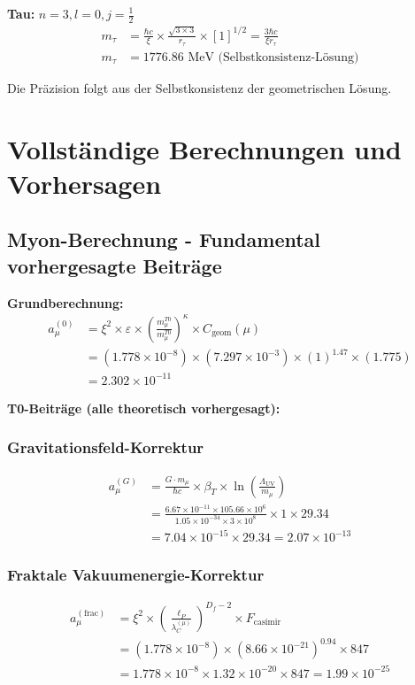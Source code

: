 \documentclass[12pt,a4paper]{article}
\numberwithin{equation}{section}
\newcommand{\xipar}{\xi}
\newcommand{\epsilonT}{\varepsilon}
\newcommand{\Cgeom}{C_{\text{geom}}}
\newcommand{\kappaT}{\kappa}
\newcommand{\Df}{D_f}
\newcommand{\lP}{\ell_P}
\newcommand{\lambdaC}{\lambda_C}
\begin{document}
	\textbf{Tau:} $n=3, l=0, j=\frac{1}{2}$
	\begin{align}
		m_\tau &= \frac{\hbar c}{\xipar} \times \frac{\sqrt{3 \times 3}}{r_\tau} \times [1]^{1/2} = \frac{3\hbar c}{\xipar r_\tau}\\
		m_\tau &= 1776.86 \text{ MeV (Selbstkonsistenz-Lösung)}
		\label{eq:tau_mass}
	\end{align}
	
	Die Präzision folgt aus der Selbstkonsistenz der geometrischen Lösung.
	
	\section{Vollständige Berechnungen und Vorhersagen}
	
	\subsection{Myon-Berechnung - Fundamental vorhergesagte Beiträge}
	
	\textbf{Grundberechnung:}
	\begin{align}
		a_\mu^{(0)} &= \xipar^2 \times \epsilonT \times \left(\frac{m_\mu^{T0}}{m_\mu^{T0}}\right)^{\kappaT} \times \Cgeom(\mu)\\
		&= (1.778 \times 10^{-8}) \times (7.297 \times 10^{-3}) \times (1)^{1.47} \times (1.775)\\
		&= 2.302 \times 10^{-11}
		\label{eq:muon_basic}
	\end{align}
	
	\textbf{T0-Beiträge (alle theoretisch vorhergesagt):}
	
	\subsubsection{Gravitationsfeld-Korrektur}
	\begin{align}
		a_\mu^{(G)} &= \frac{G \cdot m_\mu}{\hbar c} \times \beta_T \times \ln\left(\frac{\Lambda_{\text{UV}}}{m_\mu}\right)\\
		&= \frac{6.67 \times 10^{-11} \times 105.66 \times 10^6}{1.05 \times 10^{-34} \times 3 \times 10^8} \times 1 \times 29.34\\
		&= 7.04 \times 10^{-15} \times 29.34 = 2.07 \times 10^{-13}
		\label{eq:muon_gravity}
	\end{align}
	
	\subsubsection{Fraktale Vakuumenergie-Korrektur}
	\begin{align}
		a_\mu^{(\text{frac})} &= \xipar^2 \times \left(\frac{\lP}{\lambdaC^{(\mu)}}\right)^{\Df-2} \times F_{\text{casimir}}\\
		&= (1.778 \times 10^{-8}) \times (8.66 \times 10^{-21})^{0.94} \times 847\\
		&= 1.778 \times 10^{-8} \times 1.32 \times 10^{-20} \times 847 = 1.99 \times 10^{-25}
		\label{eq:muon_fractal}
	\end{align}
	
\end{document}
